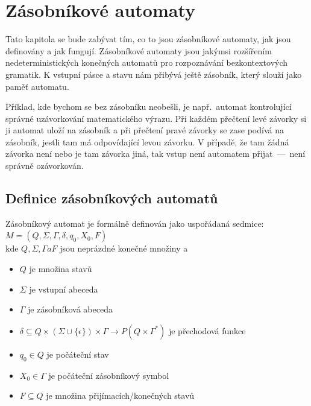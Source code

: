\chapter{Zásobníkové automaty}

Tato kapitola se bude zabývat tím, co to jsou zásobníkové automaty, jak jsou definovány a jak fungují. Zásobníkové automaty jsou jakýmsi rozšířením nedeterministických konečných automatů pro rozpoznávání bezkontextových gramatik. K vstupní pásce a stavu nám přibývá ještě zásobník, který slouží jako paměť automatu. %

Příklad, kde bychom se bez zásobníku neobešli, je např.~automat kontrolující správné uzávorkování matematického výrazu. Při každém přečtení levé závorky si ji automat uloží na zásobník a při přečtení pravé závorky se zase podívá na zásobník, jestli tam má odpovídající levou závorku. V případě, že tam žádná závorka není nebo je tam závorka jiná, tak vstup není automatem přijat~---~není správně ozávorkován.


\section{Definice zásobníkových automatů}\label{sec:DefinitonOfPDA}

Zásobníkový automat je formálně definován jako uspořádaná sedmice:\\
\indent\emph{$M = (Q, \Sigma, \Gamma, \delta, q_0, X_0, F)$}\\
kde $Q, \Sigma, \Gamma a F$ jsou neprázdné konečné množiny a 

\begin{itemize}
    \item $Q$ je množina stavů
    \item $\Sigma$ je vstupní abeceda
    \item $\Gamma$ je zásobníková abeceda
    \item $\delta \subseteq Q \times (\Sigma \cup \{\epsilon\}) \times \Gamma \rightarrow P(Q \times \Gamma^*)$ je přechodová funkce
    \item $q_0 \in Q$ je počáteční stav
    \item $X_0 \in \Gamma$ je počáteční zásobníkový symbol
    \item $F \subseteq Q$ je množina přijímacích/konečných stavů
\end{itemize}

